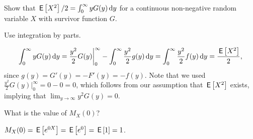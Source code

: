 \documentclass[queueing-book]{subfiles}
\begin{document}
\begin{exercise}\label{ex:l-108}
 Show that $\,\mathsf{E}\left[X^2\right]/2 = \int_0^\infty y G(y) \,\textrm{d}y$ for a continuous non-negative random variable $X$ with survivor function $G$.
 \begin{solution}
 \begin{hint}
 Use integration by parts.
 \end{hint}
 \begin{equation*}
 \int_0^\infty y G(y) \,\textrm{d}y
= \frac{y^2}2 G(y) \bigg|_0^\infty - \int_0^\infty \frac{y^2}2 g(y)\,\textrm{d}y = \int_0^\infty \frac{y^2}2 f(y)\,\textrm{d}y = \frac{\,\mathsf{E}\left[X^2\right]}2,
 \end{equation*}
 since $g(y) = G'(y) = - F'(y) = - f(y)$. Note that we used $\frac{y^2}2 G(y) \bigg|_0^\infty = 0 - 0 = 0$, which follows from our assumption that $\,\mathsf{E}\left[X^2\right]$ exists, implying that $\lim_{y \to \infty} y^2G(y) = 0$.
\end{solution}
\end{exercise}



\begin{exercise}
 What is the value of $M_X(0)$?
\begin{solution}
 $M_X(0) = \,\mathsf{E}\left[e^{0 X}\right] = \,\mathsf{E}\left[e^0\right] = \,\mathsf{E}\left[1\right] = 1$.
\end{solution}
\end{exercise}
\end{document}
